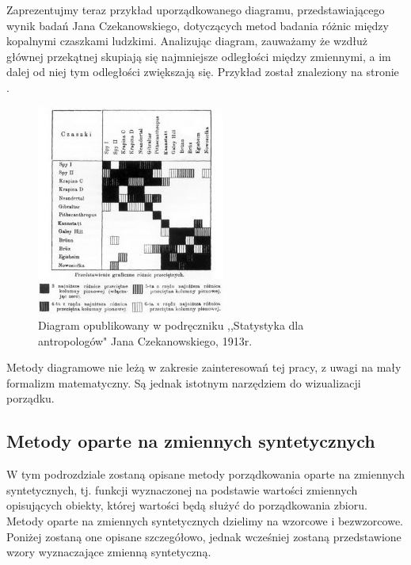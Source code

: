 \documentclass[12pt,a4paper]{report}
\begin{document}

Zaprezentujmy teraz przykład uporządkowanego diagramu, przedstawiającego wynik badań Jana Czekanowskiego, dotyczących metod badania różnic między kopalnymi czaszkami ludzkimi. Analizując diagram, zauważamy że wzdłuż głównej przekątnej skupiają się najmniejsze odległości między zmiennymi, a im dalej od niej tym odległości zwiększają się. Przykład został znaleziony na stronie \cite{czekanowski}. 
\begin{figure}[h]
\centering
\includegraphics[width=0.55\textwidth]{img/diagram_maczek.jpg}
\caption{Diagram opublikowany w podręczniku ,,Statystyka dla antropologów" Jana Czekanowskiego, 1913r. \cite{czekanowski}}
\label{fig:obrazek1}
\end{figure}

Metody diagramowe nie leżą w zakresie zainteresowań tej pracy, z uwagi na mały formalizm matematyczny. Są jednak istotnym narzędziem do wizualizacji porządku. 




\subsection{Metody oparte na zmiennych syntetycznych}

W tym podrozdziale zostaną opisane metody porządkowania oparte na zmiennych syntetycznych, tj. funkcji wyznaczonej na podstawie wartości zmiennych opisujących obiekty, której wartości będą służyć do porządkowania zbioru. Metody oparte na zmiennych syntetycznych dzielimy na wzorcowe i bezwzorcowe. Poniżej zostaną one opisane szczegółowo, jednak wcześniej zostaną przedstawione wzory wyznaczające zmienną syntetyczną. 
\end{document}
